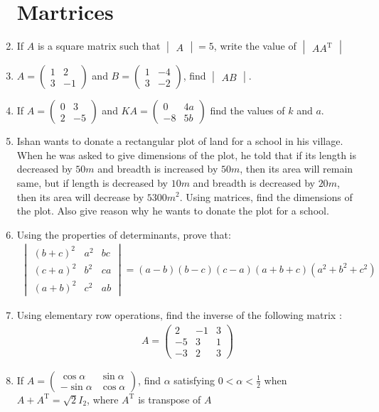 \documentclass[12pt,-letter paper]{article}
\newcommand{\myvec}[1]{\ensuremath{\begin{pmatrix}#1\end{pmatrix}}}
\newcommand{\mydet}[1]{\ensuremath{\begin{vmatrix}#1\end{vmatrix}}}
\begin{document}
\begin{enumerate}
\section{Martrices}
	\item If $A$ is a square matrix such that $\mydet{A} = 5$, write the value of 
$\mydet{AA^{\text{T}}}$

	\item $A = \myvec{1 & 2 \\ 3 & -1}$ and $B = \myvec{1 & -4 \\ 3 & -2}$, find $\mydet{AB}$.

	\item If $A = \myvec{0 & 3 \\ 2 & -5}$ and $KA = \myvec{0 & 4a \\ -8 & 5b}$ find the values of $k$ and $a$.

	\item Ishan wants to donate a rectangular plot of land for a school in his village. When he was asked to give dimensions of the plot, he told that if its length is decreased by $50m$ and breadth is increased by $50m$, then its area will remain same, but if length is decreased by $10m$ and breadth is decreased by $20m$, then its area will decrease by $5300m^2$. Using matrices, find the dimensions of the plot. Also give reason why he wants to donate the plot for a school.

	\item Using the properties of determinants, prove that:
	\begin{align*}
		\mydet{(b+c)^2 & a^2 & bc \\
		(c+a)^2 & b^2 & ca\\
		(a+b)^2 & c^2 & ab} = (a - b) (b-c) (c-a) (a+b+c) (a^2 + b^2 + c^2)
	\end{align*}
	
	\item Using elementary row operations, find the inverse of the following matrix :
	\begin{align*}
		A = \myvec{2 & -1 & 3\\
		-5 & 3 & 1 \\
		-3 & 2 & 3}
	\end{align*}



	\item If $A = \myvec{\cos \alpha & \sin \alpha\\ -\sin \alpha & \cos \alpha}$, find $\alpha$ satisfying $0<\alpha<\frac{1}{2}$ when $A + A^{\text{T}} = \sqrt{2}I_{2}$, where $A^{\text{T}}$ is transpose of $A$


\end{enumerate}
\end{document}
